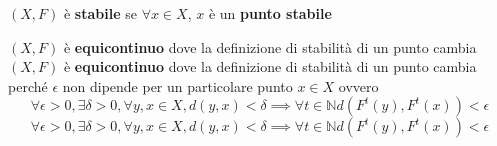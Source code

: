\begin{definizione} 
    $(X,F)$ è \textbf{stabile} se $\forall x \in X$, $x$ è un \textbf{punto stabile}
\end{definizione}

\begin{definizione} 
    $(X,F)$ è \textbf{equicontinuo} dove la definizione di stabilità di un punto cambia
    $(X,F)$ è \textbf{equicontinuo} dove la definizione di stabilità di un punto cambia
    perché $\epsilon$ non dipende per un particolare punto $x\in X$ ovvero
    $$\forall \epsilon > 0,\exists \delta > 0, \forall y, x\in X, d(y,x) < \delta \implies \forall t\in \mathbb{N} d(F^t(y),F^t(x))< \epsilon$$
    $$\forall \epsilon > 0,\exists \delta > 0, \forall y, x\in X, d(y,x) < \delta \implies \forall t\in \mathbb{N} d(F^t(y),F^t(x))< \epsilon$$
\end{definizione}

